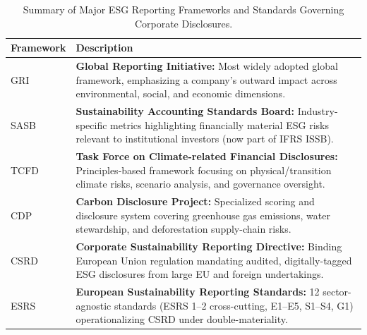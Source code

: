 \begin{table}[t]
\centering
\caption{Summary of Major ESG Reporting Frameworks and Standards Governing Corporate Disclosures.}
\label{tab:frameworks}
\small
\begin{tabularx}{\linewidth}{lX}
\toprule
\textbf{Framework} & \textbf{Description} \\
\midrule
GRI~\citep{gri2021} & \textbf{Global Reporting Initiative:} Most widely adopted global framework, emphasizing a company's outward impact across environmental, social, and economic dimensions. \\
\addlinespace[3pt]
SASB~\citep{sasb2017} & \textbf{Sustainability Accounting Standards Board:} Industry-specific metrics highlighting financially material ESG risks relevant to institutional investors (now part of IFRS ISSB). \\
\addlinespace[3pt]
TCFD~\citep{tcfd2017} & \textbf{Task Force on Climate-related Financial Disclosures:} Principles-based framework focusing on physical/transition climate risks, scenario analysis, and governance oversight. \\
\addlinespace[3pt]
CDP~\citep{cdp2025} & \textbf{Carbon Disclosure Project:} Specialized scoring and disclosure system covering greenhouse gas emissions, water stewardship, and deforestation supply-chain risks. \\
\addlinespace[3pt]
CSRD~\citep{csrd2022} & \textbf{Corporate Sustainability Reporting Directive:} Binding European Union regulation mandating audited, digitally-tagged ESG disclosures from large EU and foreign undertakings. \\
\addlinespace[3pt]
ESRS~\citep{esrs2023} & \textbf{European Sustainability Reporting Standards:} 12 sector-agnostic standards (ESRS 1--2 cross-cutting, E1--E5, S1--S4, G1) operationalizing CSRD under double-materiality. \\
\bottomrule
\end{tabularx}
\end{table}
